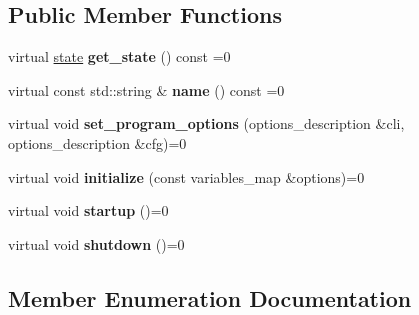 \subsection*{Public Member Functions}
\begin{DoxyCompactItemize}
\item 
\mbox{\label{classappbase_1_1abstract__plugin_a8a035293a88d04abf64883c45ac466a5}} 
virtual \mbox{\hyperlink{classappbase_1_1abstract__plugin_a4a997c146c27d5baf538a6c987c86408}{state}} {\bfseries get\+\_\+state} () const =0
\item 
\mbox{\label{classappbase_1_1abstract__plugin_afc5e65cf3fcb92e8819c82ea755cbc56}} 
virtual const std\+::string \& {\bfseries name} () const =0
\item 
\mbox{\label{classappbase_1_1abstract__plugin_a274a3c7462de3c699a8eb23741ed7655}} 
virtual void {\bfseries set\+\_\+program\+\_\+options} (options\+\_\+description \&cli, options\+\_\+description \&cfg)=0
\item 
\mbox{\label{classappbase_1_1abstract__plugin_a7d8521f978f28ee7689ae336afd64a34}} 
virtual void {\bfseries initialize} (const variables\+\_\+map \&options)=0
\item 
\mbox{\label{classappbase_1_1abstract__plugin_addfbf314be55e7a774db7c65c08e58f7}} 
virtual void {\bfseries startup} ()=0
\item 
\mbox{\label{classappbase_1_1abstract__plugin_ad615b1c385c4cb047e8adbe2e5a13322}} 
virtual void {\bfseries shutdown} ()=0
\end{DoxyCompactItemize}


\subsection{Member Enumeration Documentation}
\mbox{\label{classappbase_1_1abstract__plugin_a4a997c146c27d5baf538a6c987c86408}} 
